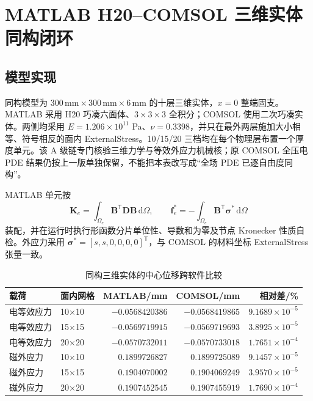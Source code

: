 \documentclass[UTF8,fontset=windows,11pt,a4paper]{ctexart}
\begin{document}
\section{MATLAB H20--COMSOL 三维实体同构闭环}

\subsection{模型实现}

同构模型为 $300\,\mathrm{mm}\times300\,\mathrm{mm}\times6\,\mathrm{mm}$ 的十层三维实体，$x=0$ 整端固支。MATLAB 采用 H20 巧凑六面体、$3\times3\times3$ 全积分；COMSOL 使用二次巧凑实体。两侧均采用 $E=1.206\times10^{11}$ Pa、$\nu=0.3398$，并只在最外两层施加大小相等、符号相反的面内 ExternalStress。10/15/20 三档均在每个物理层布置一个厚度单元。该 A 级链专门核验三维力学与等效外应力机械核；原 COMSOL 全压电 PDE 结果仍按上一版单独保留，不能把本表改写成“全场 PDE 已逐自由度同构”。

MATLAB 单元按
\[
\mathbf K_e=\int_{\Omega_e}\mathbf B^{\mathsf T}\mathbf D\mathbf B\,\mathrm d\Omega,
\qquad
\mathbf f_e^{*}=-\int_{\Omega_e}\mathbf B^{\mathsf T}\boldsymbol\sigma^{*}\,\mathrm d\Omega
\]
装配，并在运行时执行形函数分片单位性、导数和为零及节点 Kronecker 性质自检。外应力采用 $\boldsymbol\sigma^{*}=[s,s,0,0,0,0]^{\mathsf T}$，与 COMSOL 的材料坐标 ExternalStress 张量一致。

\begin{table}[H]
\centering
\caption{同构三维实体的中心位移跨软件比较}
\small
\begin{tabular}{llrrr}
\toprule
载荷 & 面内网格 & MATLAB/mm & COMSOL/mm & 相对差/\% \\
\midrule
电等效应力 & 10$\times$10 & $-0.0568420386$ & $-0.0568419865$ & $9.1689\times10^{-5}$ \\
电等效应力 & 15$\times$15 & $-0.0569719915$ & $-0.0569719693$ & $3.8925\times10^{-5}$ \\
电等效应力 & 20$\times$20 & $-0.0570732011$ & $-0.0570733018$ & $1.7651\times10^{-4}$ \\
磁外应力 & 10$\times$10 & $0.1899726827$ & $0.1899725089$ & $9.1457\times10^{-5}$ \\
磁外应力 & 15$\times$15 & $0.1904070002$ & $0.1904069249$ & $3.9570\times10^{-5}$ \\
磁外应力 & 20$\times$20 & $0.1907452545$ & $0.1907455919$ & $1.7690\times10^{-4}$ \\
\bottomrule
\end{tabular}
\end{table}
\end{document}
